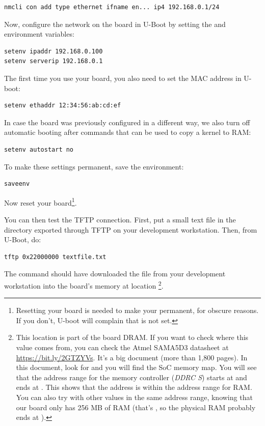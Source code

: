 \begin{verbatim}
nmcli con add type ethernet ifname en... ip4 192.168.0.1/24
\end{verbatim}

Now, configure the network on the board in U-Boot by setting the 
and  environment variables:

\begin{verbatim}
setenv ipaddr 192.168.0.100
setenv serverip 192.168.0.1
\end{verbatim}

The first time you use your board, you also need to set the MAC
address in U-boot:

\begin{verbatim}
setenv ethaddr 12:34:56:ab:cd:ef
\end{verbatim}

In case the board was previously configured in a different way, we
also turn off automatic booting after commands that can be used to
copy a kernel to RAM:

\begin{verbatim}
setenv autostart no
\end{verbatim}

To make these settings permanent, save the environment:

\begin{verbatim}
saveenv
\end{verbatim}

Now reset your board\footnote{Resetting your board is needed to
make your  permanent, for obscure reasons. If you
don't, U-boot will complain that  is not
set.}.

You can then test the TFTP connection. First, put a small text file in
the directory exported through TFTP on your development
workstation. Then, from U-Boot, do:

\begin{verbatim}
tftp 0x22000000 textfile.txt
\end{verbatim}

The  command should have downloaded the
 file from your development workstation into
the board's memory at location \footnote{
This location is part of the board DRAM. If you want
to check where this value comes from, you can check the Atmel SAMA5D3
datasheet at \url{https://bit.ly/2GTZYVs}. It's a big document (more than 1,800
pages). In this document, look for  and you
will find the SoC memory map. You will see that the address range for
the memory controller ({\em DDRC S}) starts at 
and ends at . This shows that the  
address is within the address range for RAM. You can also try with other
values in the same address range, knowing that our board only has 256 MB
of RAM (that's , so the physical RAM probably ends at
).}.

